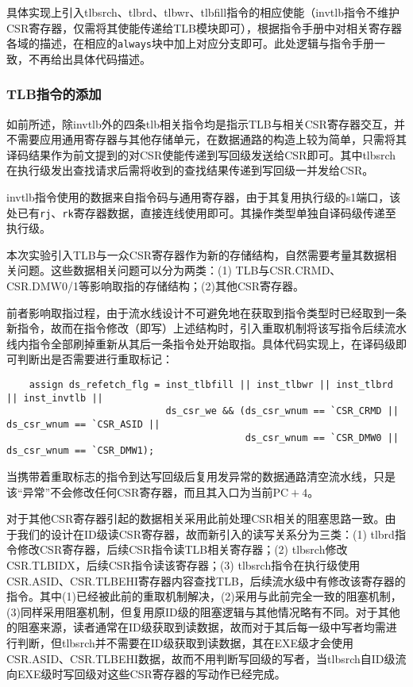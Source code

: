 \documentclass[UTF-8,twoside,c5size]{ctexart}
\begin{document}
    具体实现上引入tlbsrch、tlbrd、tlbwr、tlbfill指令的相应使能（invtlb指令不维护CSR寄存器，仅需将其使能传递给TLB模块即可），根据指令手册中对相关寄存器各域的描述，在相应的\texttt{always}块中加上对应分支即可。此处逻辑与指令手册一致，不再给出具体代码描述。
    
    \subsubsection{\textbf{TLB}指令的添加}
    
    如前所述，除invtlb外的四条tlb相关指令均是指示TLB与相关CSR寄存器交互，并不需要应用通用寄存器与其他存储单元，在数据通路的构造上较为简单，只需将其译码结果作为前文提到的对CSR使能传递到写回级发送给CSR即可。其中tlbsrch在执行级发出查找请求后需将收到的查找结果传递到写回级一并发给CSR。
    
    invtlb指令使用的数据来自指令码与通用寄存器，由于其复用执行级的s1端口，该处已有\texttt{rj}、\texttt{rk}寄存器数据，直接连线使用即可。其操作类型单独自译码级传递至执行级。
    
    本次实验引入TLB与一众CSR寄存器作为新的存储结构，自然需要考量其数据相关问题。这些数据相关问题可以分为两类：(1) TLB与CSR.CRMD、CSR.DMW0/1等影响取指的存储结构；(2)其他CSR寄存器。
    
    前者影响取指过程，由于流水线设计不可避免地在获取到指令类型时已经取到一条新指令，故而在指令修改（即写）上述结构时，引入重取机制将该写指令后续流水线内指令全部刷掉重新从其后一条指令处开始取指。具体代码实现上，在译码级即可判断出是否需要进行重取标记：
    \begin{verbatim}
    assign ds_refetch_flg = inst_tlbfill || inst_tlbwr || inst_tlbrd || inst_invtlb ||
                            ds_csr_we && (ds_csr_wnum == `CSR_CRMD || ds_csr_wnum == `CSR_ASID ||
                                          ds_csr_wnum == `CSR_DMW0 || ds_csr_wnum == `CSR_DMW1);
    \end{verbatim}
    当携带着重取标志的指令到达写回级后复用发异常的数据通路清空流水线，只是该“异常”不会修改任何CSR寄存器，而且其入口为当前$\mathrm{PC} + 4$。
    
    对于其他CSR寄存器引起的数据相关采用此前处理CSR相关的阻塞思路一致。由于我们的设计在ID级读CSR寄存器，故而新引入的读写关系分为三类：(1) tlbrd指令修改CSR寄存器，后续CSR指令读TLB相关寄存器；(2) tlbsrch修改CSR.TLBIDX，后续CSR指令读该寄存器；(3) tlbsrch指令在执行级使用CSR.ASID、CSR.TLBEHI寄存器内容查找TLB，后续流水级中有修改该寄存器的指令。其中(1)已经被此前的重取机制解决，(2)采用与此前完全一致的阻塞机制，(3)同样采用阻塞机制，但复用原ID级的阻塞逻辑与其他情况略有不同。对于其他的阻塞来源，读者通常在ID级获取到读数据，故而对于其后每一级中写者均需进行判断，但tlbsrch并不需要在ID级获取到读数据，其在EXE级才会使用CSR.ASID、CSR.TLBEHI数据，故而不用判断写回级的写者，当tlbsrch自ID级流向EXE级时写回级对这些CSR寄存器的写动作已经完成。
    
\end{document}
